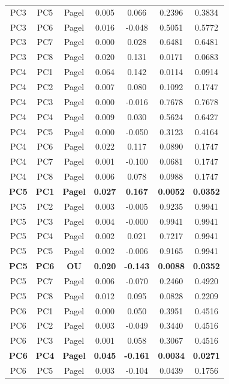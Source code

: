 \begin{table}[!h]
\begin{tabular}[t]{ccccccc}
\addlinespace
PC3 & PC5 & Pagel & 0.005 & 0.066 & 0.2396 & 0.3834\\
PC3 & PC6 & Pagel & 0.016 & -0.048 & 0.5051 & 0.5772\\
PC3 & PC7 & Pagel & 0.000 & 0.028 & 0.6481 & 0.6481\\
PC3 & PC8 & Pagel & 0.020 & 0.131 & 0.0171 & 0.0683\\
PC4 & PC1 & Pagel & 0.064 & 0.142 & 0.0114 & 0.0914\\
\addlinespace
PC4 & PC2 & Pagel & 0.007 & 0.080 & 0.1092 & 0.1747\\
PC4 & PC3 & Pagel & 0.000 & -0.016 & 0.7678 & 0.7678\\
PC4 & PC4 & Pagel & 0.009 & 0.030 & 0.5624 & 0.6427\\
PC4 & PC5 & Pagel & 0.000 & -0.050 & 0.3123 & 0.4164\\
PC4 & PC6 & Pagel & 0.022 & 0.117 & 0.0890 & 0.1747\\
\addlinespace
PC4 & PC7 & Pagel & 0.001 & -0.100 & 0.0681 & 0.1747\\
PC4 & PC8 & Pagel & 0.006 & 0.078 & 0.0988 & 0.1747\\
\textbf{PC5} & \textbf{PC1} & \textbf{Pagel} & \textbf{0.027} & \textbf{0.167} & \textbf{0.0052} & \textbf{0.0352}\\
PC5 & PC2 & Pagel & 0.003 & -0.005 & 0.9235 & 0.9941\\
PC5 & PC3 & Pagel & 0.004 & -0.000 & 0.9941 & 0.9941\\
\addlinespace
PC5 & PC4 & Pagel & 0.002 & 0.021 & 0.7217 & 0.9941\\
PC5 & PC5 & Pagel & 0.002 & -0.006 & 0.9165 & 0.9941\\
\textbf{PC5} & \textbf{PC6} & \textbf{OU} & \textbf{0.020} & \textbf{-0.143} & \textbf{0.0088} & \textbf{0.0352}\\
PC5 & PC7 & Pagel & 0.006 & -0.070 & 0.2460 & 0.4920\\
PC5 & PC8 & Pagel & 0.012 & 0.095 & 0.0828 & 0.2209\\
\addlinespace
PC6 & PC1 & Pagel & 0.000 & 0.050 & 0.3951 & 0.4516\\
PC6 & PC2 & Pagel & 0.003 & -0.049 & 0.3440 & 0.4516\\
PC6 & PC3 & Pagel & 0.001 & 0.058 & 0.3067 & 0.4516\\
\textbf{PC6} & \textbf{PC4} & \textbf{Pagel} & \textbf{0.045} & \textbf{-0.161} & \textbf{0.0034} & \textbf{0.0271}\\
PC6 & PC5 & Pagel & 0.003 & -0.104 & 0.0439 & 0.1756\\

\end{tabular}
\end{table}
